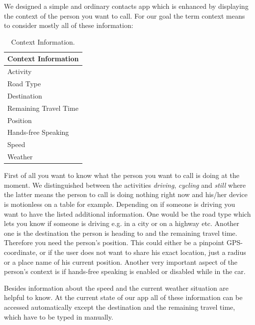 \documentclass{sigchi}
\begin{document}
We designed a simple and ordinary contacts app which is enhanced by displaying the context of the person you want to call. For our goal the term context means to consider mostly all of these information:
\newline

\begin{center}
\begin{table}[htbp]
\begin{center}
\begin{tabular}[center]{l}
\toprule
Context Information\\
\midrule
Activity \\
Road Type \\
Destination \\
Remaining Travel Time \\
Position \\
Hands-free Speaking \\
Speed \\
Weather \\
\bottomrule
\end{tabular}
\end{center}
\caption[Context Information]{Context Information.\label{tab:cont}}
\end{table}
\end{center}

First of all you want to know what the person you want to call is doing at the moment. We distinguished between the activities \textit{driving}, \textit{cycling} and \textit{still} where the latter means the person to call is doing nothing right now and his/her device is motionless on a table for example. Depending on if someone is driving you want to have the listed additional information. One would be the road type which lets you know if someone is driving e.g. in a city or on a highway etc. Another one is the destination the person is heading to and the remaining travel time. Therefore you need the person's position. This could either be a pinpoint GPS-coordinate, or if the user does not want to share his exact location, just a radius or a place name of his current position. Another very important aspect of the person's context is if hands-free speaking is enabled or disabled while in the car. 

Besides information about the speed and the current weather situation are helpful to know. At the current state of our app all of these information can be accessed automatically except the destination and the remaining travel time, which have to be typed in manually.
\end{document}

